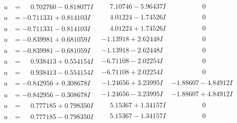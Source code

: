 \documentclass[1p]{elsarticle_modified}
\theoremstyle{definition}
\begin{document}
$$\begin{array}{c|c|c}
\begin{aligned}
u &= \phantom{-}0.702760 - 0.818077 I\end{aligned}
 & \phantom{-}7.10746 - 5.96437 I & \phantom{-0.000000 } 0 \\ \hline\begin{aligned}
u &= -0.711331 + 0.814103 I\end{aligned}
 & \phantom{-}4.01224 - 1.74526 I & \phantom{-0.000000 } 0 \\ \hline\begin{aligned}
u &= -0.711331 - 0.814103 I\end{aligned}
 & \phantom{-}4.01224 + 1.74526 I & \phantom{-0.000000 } 0 \\ \hline\begin{aligned}
u &= -0.839981 + 0.681059 I\end{aligned}
 & -1.13918 + 2.62448 I & \phantom{-0.000000 } 0 \\ \hline\begin{aligned}
u &= -0.839981 - 0.681059 I\end{aligned}
 & -1.13918 - 2.62448 I & \phantom{-0.000000 } 0 \\ \hline\begin{aligned}
u &= \phantom{-}0.938413 + 0.554154 I\end{aligned}
 & -6.71108 - 2.02254 I & \phantom{-0.000000 } 0 \\ \hline\begin{aligned}
u &= \phantom{-}0.938413 - 0.554154 I\end{aligned}
 & -6.71108 + 2.02254 I & \phantom{-0.000000 } 0 \\ \hline\begin{aligned}
u &= -0.842956 + 0.308678 I\end{aligned}
 & -1.24656 + 3.23995 I & -1.88607 - 4.84912 I \\ \hline\begin{aligned}
u &= -0.842956 - 0.308678 I\end{aligned}
 & -1.24656 - 3.23995 I & -1.88607 + 4.84912 I \\ \hline\begin{aligned}
u &= \phantom{-}0.777185 + 0.798350 I\end{aligned}
 & \phantom{-}5.15367 + 1.34157 I & \phantom{-0.000000 } 0 \\ \hline\begin{aligned}
u &= \phantom{-}0.777185 - 0.798350 I\end{aligned}
 & \phantom{-}5.15367 - 1.34157 I & \phantom{-0.000000 } 0 \\ \hline\begin{aligned}

\end{aligned}
\end{array}$$
\end{document}
